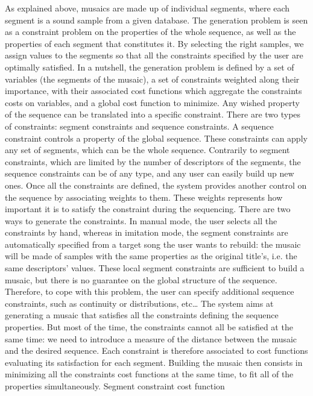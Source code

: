 \cite{Zils2001} As explained above, musaics are made up of individual segments, where each segment is a sound sample from a given database. The generation problem is seen as a constraint problem on the properties of the whole sequence, as well as the properties of each segment that constitutes it. By selecting the right samples, we assign values to the segments so that all the constraints specified by the user are optimally satisfied. In a nutshell, the generation problem is defined by a set of variables (the segments of the musaic), a set of constraints weighted along their importance, with their associated cost functions which aggregate the constraints costs on variables, and a global cost function to minimize. Any wished property of the sequence can be translated into a specific constraint. There are two types of constraints: segment constraints and sequence constraints. A sequence constraint controls a property of the global sequence. These constraints can apply any set of segments, which can be the whole sequence. Contrarily to segment constraints, which are limited by the number of descriptors of the segments, the sequence constraints can be of any type, and any user can easily build up new ones. Once all the constraints are defined, the system provides another control on the sequence by associating weights to them. These weights represents how important it is to satisfy the constraint during the sequencing. There are two ways to generate the constraints. In manual
mode, the user selects all the constraints by hand, whereas in imitation mode, the segment constraints are automatically specified from a target song the user wants to rebuild: the musaic will be made of samples with the same properties as the original title’s, i.e. the same descriptors’ values. These local segment constraints are sufficient to build a musaic, but there is no guarantee on the global structure of the sequence. Therefore, to cope with this problem, the user can specify additional sequence constraints, such as continuity or distributions, etc… The system aims at generating a musaic that satisfies all the
constraints defining the sequence properties. But most of the time, the constraints cannot all be satisfied at the same time: we need to introduce a measure of the distance between the musaic and the desired sequence. Each constraint is therefore associated to cost functions evaluating its satisfaction for each segment. Building the musaic then consists in minimizing all the constraints cost functions at the same time, to fit all of the properties simultaneously.
Segment constraint cost function
